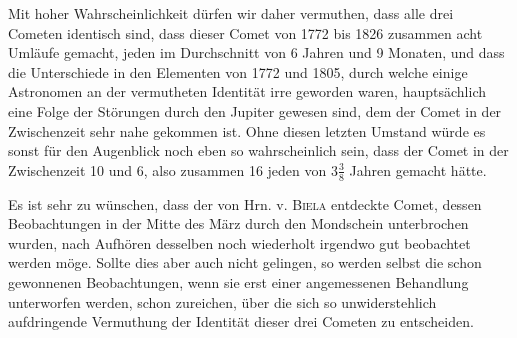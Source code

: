 Mit hoher Wahrscheinlichkeit dürfen wir daher vermuthen, dass alle drei Cometen
identisch sind, dass dieser Comet von 1772 bis 1826 zusammen acht Umläufe gemacht,
jeden im Durchschnitt von 6 Jahren und 9 Monaten, und dass die Unterschiede in den
Elementen von 1772 und 1805, durch welche einige Astronomen an der vermutheten
Identität irre geworden waren, hauptsächlich eine Folge der Störungen durch den
Jupiter gewesen sind, dem der Comet in der Zwischenzeit sehr nahe gekommen ist. Ohne
diesen letzten Umstand würde es sonst für den Augenblick noch eben so wahrscheinlich
sein, dass der Comet in der Zwischenzeit 10 und 6, also zusammen 16 jeden von
$3\frac{3}{8}$ Jahren gemacht hätte.

Es ist sehr zu wünschen, dass der von Hrn. v. \textsc{Biela} entdeckte Comet, dessen
Beobachtungen in der Mitte des März durch den Mondschein unterbrochen wurden, nach
Aufhören desselben noch wiederholt irgendwo gut beobachtet werden möge. Sollte dies
aber auch nicht gelingen, so werden selbst die schon gewonnenen Beobachtungen, wenn
sie erst einer angemessenen Behandlung unterworfen werden, schon zureichen, über die
sich so unwiderstehlich aufdringende Vermuthung der Identität dieser drei Cometen zu
entscheiden.
